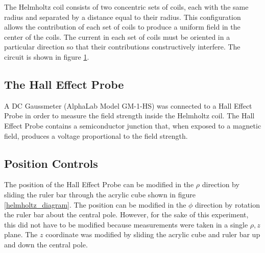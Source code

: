 \documentclass[a4paper]{article}
\begin{document}
The Helmholtz coil consists of two concentric sets of coils, each with
the same radius and separated by a distance equal to their
radius. This configuration allows the contribution of each set of
coils to produce a uniform field in the center of the coils. The
current in each set of coils must be oriented in a particular
direction so that their contributions constructively interfere. The
circuit is shown in figure \ref{helmholtz_circuit}.

\begin{figure}[h]
\centering
\label{helmholtz_circuit}
\end{figure}

\subsection{The Hall Effect Probe}

A DC Gaussmeter (AlphaLab Model GM-1-HS) was connected to a Hall
Effect Probe in order to measure the field strength inside the
Helmholtz coil. The Hall Effect Probe contains a semiconductor
junction that, when exposed to a magnetic field, produces a voltage
proportional to the field strength.

\subsection{Position Controls}

The position of the Hall Effect Probe can be modified in the $\rho$
direction by sliding the ruler bar through the acrylic cube shown in
figure \ref{helmholtz_diagram}. The position can be modified in the
$\phi$ direction by rotation the ruler bar about the central
pole. However, for the sake of this experiment, this did not have to
be modified because measurements were taken in a single $\rho , z$
plane. The $z$ coordinate was modified by sliding the acrylic cube and
ruler bar up and down the central pole.
\end{document}
